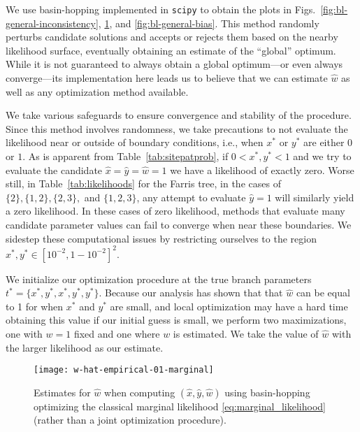We use basin-hopping \cite{Wales1997} implemented in \texttt{scipy} \cite{Jones2001} to obtain the plots in Figs.~\ref{fig:bl-general-inconsistency}, \ref{fig:bl-general-marginal}, and \ref{fig:bl-general-bias}.
This method randomly perturbs candidate solutions and accepts or rejects them based on the nearby likelihood surface, eventually obtaining an estimate of the ``global'' optimum.
While it is not guaranteed to always obtain a global optimum---or even always converge---its implementation here leads us to believe that we can estimate $\hat{w}$ as well as any optimization method available.

We take various safeguards to ensure convergence and stability of the procedure.
Since this method involves randomness, we take precautions to not evaluate the likelihood near or outside of boundary conditions, i.e., when $x^*$ or $y^*$ are either $0$ or $1$.
As is apparent from Table~\ref{tab:sitepatprob}, if $0 < x^*, y^* < 1$ and we try to evaluate the candidate $\hat{x}=\hat{y}=\hat{w}=1$ we have a likelihood of exactly zero.
Worse still, in Table~\ref{tab:likelihoods} for the Farris tree, in the cases of $\{2\}, \{1,2\}, \{2,3\},$ and $\{1,2,3\}$, any attempt to evaluate $\hat{y}=1$ will similarly yield a zero likelihood.
In these cases of zero likelihood, methods that evaluate many candidate parameter values can fail to converge when near these boundaries.
We sidestep these computational issues by restricting ourselves to the region $x^*,y^*\in [10^{-2},1-10^{-2}]^2$.

We initialize our optimization procedure at the true branch parameters $t^*=\{x^*,y^*,x^*,y^*,y^*\}$.
Because our analysis has shown that that $\hat{w}$ can be equal to 1 for when $x^*$ and $y^*$ are small, and local optimization may have a hard time obtaining this value if our initial guess is small, we perform two maximizations, one with $w=1$ fixed and one where $w$ is estimated.
We take the value of $\hat{w}$ with the larger likelihood as our estimate.

\begin{figure}
\centering
\texttt{[image: w-hat-empirical-01-marginal]}
\caption{
    Estimates for $\hat{w}$ when computing $(\hat{x}, \hat{y}, \hat{w})$ using basin-hopping \cite{Wales1997} optimizing the classical marginal likelihood \eqref{eq:marginal_likelihood} (rather than a joint optimization procedure).
}
\label{fig:bl-general-marginal}
\end{figure}

